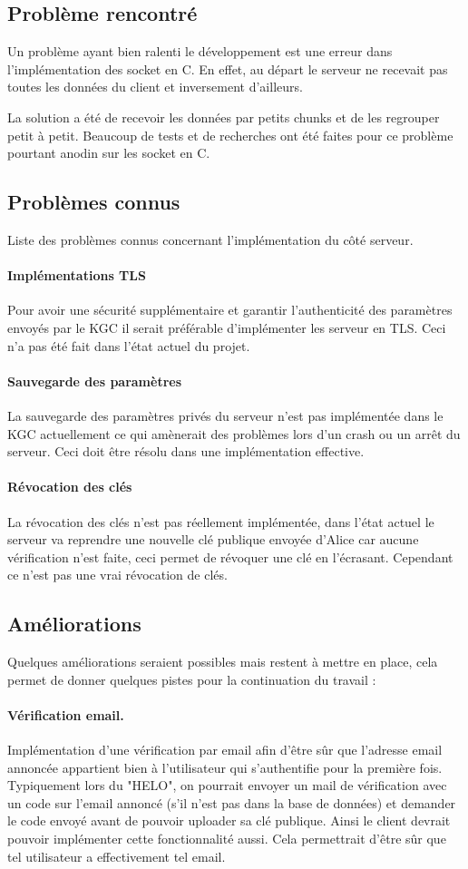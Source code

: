 \subsection{Problème rencontré}
Un problème ayant bien ralenti le développement est une erreur dans l'implémentation des socket en C. En effet, au départ le serveur ne recevait pas toutes les données du client et inversement d'ailleurs.

La solution a été de recevoir les données par petits chunks et de les regrouper petit à petit. Beaucoup de tests et de recherches ont été faites pour ce problème pourtant anodin sur les socket en C.
\subsection{Problèmes connus}
Liste des problèmes connus concernant l'implémentation du côté serveur.
\paragraph*{Implémentations TLS}
Pour avoir une sécurité supplémentaire et garantir l'authenticité des paramètres envoyés par le KGC il serait préférable d'implémenter les serveur en TLS. Ceci n'a pas été fait dans l'état actuel du projet.
\paragraph*{Sauvegarde des paramètres}
La sauvegarde des paramètres privés du serveur n'est pas implémentée dans le KGC actuellement ce qui amènerait des problèmes lors d'un crash ou un arrêt du serveur. Ceci doit être résolu dans une implémentation effective.
\paragraph*{Révocation des clés}
La révocation des clés n'est pas réellement implémentée, dans l'état actuel le serveur va reprendre une nouvelle clé publique envoyée d'Alice car aucune vérification n'est faite, ceci permet de révoquer une clé en l'écrasant. Cependant ce n'est pas une vrai révocation de clés.
\subsection{Améliorations}
Quelques améliorations seraient possibles mais restent à mettre en place, cela permet de donner quelques pistes pour la continuation du travail :
\paragraph*{Vérification email.}
Implémentation d'une vérification par email afin d'être sûr que l'adresse email annoncée appartient bien à l'utilisateur qui s'authentifie pour la première fois. Typiquement lors du "HELO", on pourrait envoyer un mail de vérification avec un code sur l'email annoncé (s'il n'est pas dans la base de données) et demander le code envoyé avant de pouvoir uploader sa clé publique. Ainsi le client devrait pouvoir implémenter cette fonctionnalité aussi. Cela permettrait d'être sûr que tel utilisateur a effectivement tel email.
